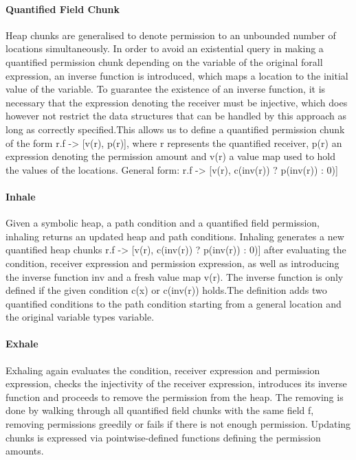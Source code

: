 \documentclass[12pt]{article}
\begin{document}
\paragraph{Quantified Field Chunk}
Heap chunks are generalised to denote permission to an unbounded number of locations simultaneously.
In order to avoid an existential query in making a quantified permission chunk depending on the variable of the original forall expression, an inverse function is introduced, which maps a location to the initial value of the variable. To guarantee the existence of an inverse function, it is necessary that the expression denoting the receiver must be injective, which does however not restrict the data structures that can be handled by this approach as long as correctly specified.This allows us to define a quantified permission chunk of the form r.f -> [v(r), p(r)], where r represents the quantified receiver, p(r) an expression denoting the permission amount and v(r) a value map used to hold the values of the locations.
General form: r.f -> [v(r), c(inv(r)) ? p(inv(r)) : 0)]

\paragraph{Inhale}
Given a symbolic heap, a path condition and a quantified field permission, inhaling returns an updated heap and path conditions.
Inhaling generates a new quantified heap chunks  r.f -> [v(r), c(inv(r)) ? p(inv(r)) : 0)] after evaluating the condition, receiver expression and permission expression, as well as introducing the inverse function inv and a fresh value map v(r).
The inverse function is only defined if the given condition c(x) or c(inv(r)) holds.The definition adds two quantified conditions to the path condition starting from a general location and the original variable types variable.


\paragraph{Exhale}
Exhaling again evaluates the condition, receiver expression and permission expression, checks the injectivity of the receiver expression, introduces its inverse function and proceeds to remove the permission from the heap.
The removing is done by walking through all quantified field chunks with the same field f, removing permissions greedily or fails if there is not enough permission. Updating chunks is expressed via pointwise-defined functions defining the permission amounts.
\end{document}
